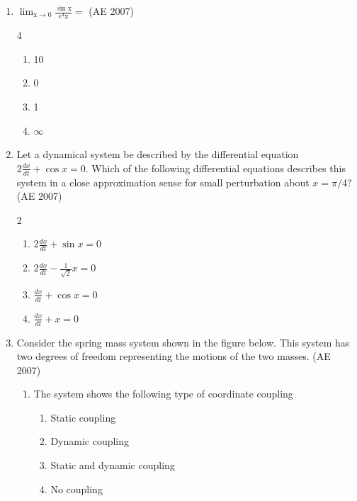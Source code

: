 \begin{enumerate}[label=\thesubsection.\arabic*,ref=\thesubsection.\theenumi]
    \item $\mathrm{\lim_{x \to 0} \frac{\sin x}{e^4 x} =}$
    \hfill (AE 2007)
    \begin{multicols}{4}
\begin{enumerate}
        \item 10
        \item 0
        \item 1
        \item $\infty$
    \end{enumerate}
    \end{multicols}
    \item Let a dynamical system be described by the differential equation $2 \frac{dx}{dt} + \cos x = 0$. Which of the following differential equations describes this system in a close approximation sense for small perturbation about $x = \pi/4$?
    \hfill (AE 2007)
    \begin{multicols}{2}
\begin{enumerate}
        \item $2 \frac{dx}{dt} + \sin x = 0$
        \item $2 \frac{dx}{dt} - \frac{1}{\sqrt{2}} x = 0$
        \item $\frac{dx}{dt} + \cos x = 0$
        \item $\frac{dx}{dt} + x = 0$
    \end{enumerate}
    \end{multicols}
\item  Consider the spring mass system shown in the figure below. This system has two degrees of freedom representing the motions of the two masses.
\hfill (AE 2007)

\begin{figure}[H]
    \centering
    
    \caption{}
    \label{fig:q74 75}
\end{figure}

\begin{enumerate}
    \item The system shows the following type of coordinate coupling
    \begin{enumerate}
        \item Static coupling
        \item Dynamic coupling
        \item Static and dynamic coupling
        \item No coupling
    \end{enumerate}


\end{enumerate}
\end{enumerate}
